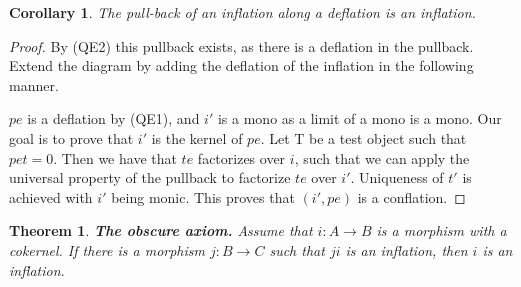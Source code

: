 \documentclass[11pt]{article}
\newtheorem{theorem}{Theorem}[section]
\newtheorem{corollary}{Corollary}[theorem]
\theoremstyle{definition}
\theoremstyle{remark}
\begin{document}
            \begin{corollary}
                The pull-back of an inflation along a deflation is an inflation.
                \begin{center}
                \end{center}
            \end{corollary}

            \begin{proof}
                By (QE2) this pullback exists, as there is a deflation in the pullback. Extend the diagram by adding the deflation of the inflation in the following manner.
                \begin{center}
                \end{center}
                $pe$ is a deflation by (QE1), and $i'$ is a mono as a limit of a mono is a mono. Our goal is to prove that $i'$ is the kernel of $pe$. Let T be a test object such that $pet=0$. Then we have that $te$ factorizes over $i$, such that we can apply the universal property of the pullback to factorize $te$ over $i'$. Uniqueness of $t'$ is achieved with $i'$ being monic. This proves that $(i',pe)$ is a conflation.
            \end{proof}

            \begin{theorem}
                \textbf{The obscure axiom.} Assume that $i:A\rightarrow B$ is a morphism with a cokernel. If there is a morphism $j:B\rightarrow C$ such that $ji$ is an inflation, then $i$ is an inflation.
            \end{theorem}
\end{document}
